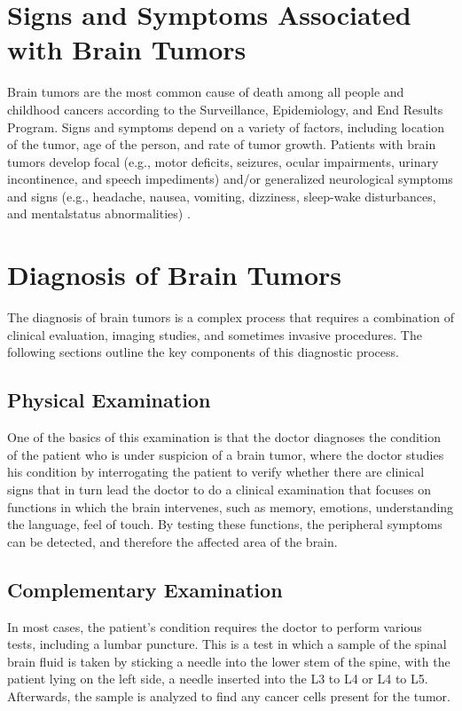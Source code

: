 \section{Signs and Symptoms Associated with Brain Tumors}
Brain tumors are the most common cause of death among all people and childhood cancers according to the Surveillance, Epidemiology,
and End Results Program. Signs and symptoms depend on a variety
of factors, including location of the tumor, age of the person, and rate
of tumor growth. Patients with brain tumors develop focal (e.g., motor
deficits, seizures, ocular impairments, urinary incontinence, and speech
impediments) and/or generalized neurological symptoms and signs (e.g.,
headache, nausea, vomiting, dizziness, sleep-wake disturbances, and mentalstatus abnormalities) \cite{ref9}.

\section{Diagnosis of Brain Tumors}
\label{sec:diagnosis-brain-tumors}
The diagnosis of brain tumors is a complex process that requires a combination of clinical evaluation, imaging studies, and sometimes invasive procedures. The following sections outline the key components of this diagnostic process.
\subsection{Physical Examination}
One of the basics of this examination is that the doctor diagnoses the condition of the patient who is under suspicion of a brain tumor, where the doctor studies his condition by interrogating the patient to verify whether there are clinical signs that in turn lead the doctor to do a clinical examination that focuses on functions in which the brain intervenes, such as memory, emotions, understanding the language, feel of touch. By testing these functions, the peripheral symptoms can be detected, and therefore the affected area of the brain.

\subsection{Complementary Examination}
In most cases, the patient's condition requires the doctor to perform various tests, including a lumbar puncture. This is a test in which a sample of the spinal brain fluid is taken by sticking a needle into the lower stem of the spine, with the patient lying on the left side, a needle inserted into the L3 to L4 or L4 to L5. Afterwards, the sample is analyzed to find any cancer cells present for the tumor.

